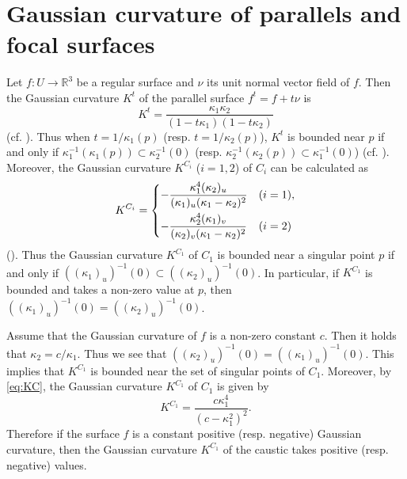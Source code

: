 \documentclass[11pt,a4paper,pdflatex,final]{amsart}
\theoremstyle{plain}
\theoremstyle{definition}
\theoremstyle{remark}
\newcommand{\0}{\bm{0}}
\newcommand{\R}{\mathbb{R}}
\numberwithin{equation}{section}
\begin{document}
\appendix
{
\section{Gaussian curvature of parallels and focal surfaces}\label{sec:appendix}
Let $f\colon U\to\R^3$ be a regular surface 
and $\nu$ its unit normal vector field of $f$. 
Then the Gaussian curvature $K^t$ of the parallel surface $f^t=f+t\nu$ is 
\[
K^t=\frac{\kappa_1\kappa_2}{(1-t\kappa_1)(1-t\kappa_2)}
\]
(cf. \cite{eisen}). 
Thus when $t=1/\kappa_1(p)$ (resp. $t=1/\kappa_2(p)$), 
$K^t$ is bounded near $p$ if and only if 
$\kappa_1^{-1}(\kappa_1(p))\subset \kappa_2^{-1}(0)$ 
(resp. $\kappa_2^{-1}(\kappa_2(p))\subset \kappa_1^{-1}(0)$) (cf. \cite{suy-front,msuy}). 
Moreover, the Gaussian curvature $K^{C_i}$ ($i=1,2$) of $C_i$ can be calculated as 
\begin{equation}\label{eq:KC}
	K^{C_i}
	=\begin{dcases}
		-\frac{\kappa_1^4(\kappa_2)_{u}}{(\kappa_1)_u(\kappa_1-\kappa_2)^2} & (i=1),\\
		-\frac{\kappa_2^4(\kappa_1)_{v}}{(\kappa_2)_v(\kappa_1-\kappa_2)^2} & (i=2)
	\end{dcases}
\end{equation}
(\cite{morris,eisen}). 
Thus the Gaussian curvature $K^{C_1}$ of $C_1$ 
is bounded near a singular point $p$ 
if and only if $((\kappa_1)_u)^{-1}(0)\subset((\kappa_2)_{u})^{-1}(0)$. 
In particular, if $K^{C_1}$ is bounded and takes a non-zero value at $p$, 
then $((\kappa_1)_u)^{-1}(0)=((\kappa_2)_{u})^{-1}(0)$.

Assume that the Gaussian curvature of $f$ is a non-zero constant $c$. 
Then it holds that $\kappa_2=c/\kappa_1$. 
Thus we see that $((\kappa_2)_u)^{-1}(0)=((\kappa_1)_u)^{-1}(0)$. 
This implies that $K^{C_1}$ is bounded near the set of singular points of $C_1$. 
Moreover, by \eqref{eq:KC}, the Gaussian curvature $K^{C_1}$ of $C_1$ is given by 
\begin{equation}\label{eq:KC2}
	K^{C_1}=\frac{c\kappa_1^4}{(c-\kappa_1^2)^2}.
\end{equation}
Therefore if the surface $f$ is a constant positive (resp. negative) Gaussian curvature, 
then the Gaussian curvature $K^{C_1}$ of the caustic takes positive (resp. negative) values. 
}

\end{document}
